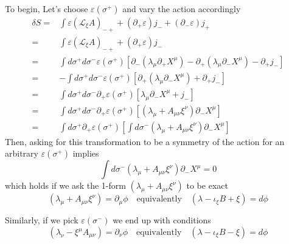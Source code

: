 \documentclass[a4paper,12pt]{article}
\numberwithin{equation}{section}
\numberwithin{thm}{section}
\numberwithin{exm}{section}
\newcommand{\p}{\partial}
\newcommand{\lag}{\mathcal L}
\newcommand{\<}{{\langle}}
\renewcommand{\>}{{\rangle}}
\newcommand{\ve}{{\varepsilon}}
\renewcommand{\l}{{\lambda}}
\newcommand{\m}{{\mu}}
\newcommand{\n}{{\nu}}
\newcommand{\s}{{\sigma}}
\begin{document}
To begin, Let's choose $\ve(\s^+)$ and vary the action accordingly
	\begin{align}
	\delta S=&\int \varepsilon (\lag_\xi A)_{-+}+(\p_+\varepsilon)j_- +(\p_-\varepsilon)j_+ \nonumber \\
	=&\int \varepsilon (\lag_\xi A)_{-+}+(\p_+\varepsilon)j_- \nonumber \\
	=&\int d\s^+d\s^- \ve(\s^+)\left[\p_-(\lambda_\mu\p_+X^\mu)-\p_+(\lambda_\mu\p_-X^\mu)-\p_+j_-\right] \nonumber \\
	=&-\int d\s^+d\s^- \ve(\s^+)\left[\p_+(\lambda_\mu\p_-X^\mu)+\p_+j_-\right] \nonumber \\
	=&\int d\s^+d\s^- \p_+\ve(\s^+)\left[\lambda_\mu\p_-X^\mu+j_-\right] \nonumber \\
	=&\int d\s^+d\s^- \p_+\ve(\s^+)\left[(\lambda_\mu+A_{\mu\nu}\xi^\nu)\p_-X^\mu\right] \nonumber \\
	=&\int d\s^+\p_+\ve(\s^+)\left[\int d\s^-(\lambda_\mu+A_{\mu\nu}\xi^\nu)\p_-X^\mu\right]
	\end{align}
Then, asking for this transformation to be a symmetry of the action for an arbitrary $\ve(\s^+)$ implies
	\begin{equation}
	\int d\s^-(\lambda_\mu+A_{\mu\nu}\xi^\nu)\p_-X^\mu=0
	\end{equation}
which holds if we ask the 1-form $(\lambda_\mu+A_{\mu\nu}\xi^\nu)$ to be exact
	\begin{equation}
	(\l_\m + A_{\m\n}\xi^\n) = \p_\m \phi \quad\text{equivalently}\quad (\l - \iota_\xi B + \xi)=d\phi
	\end{equation}

Similarly, if we pick $\ve(\s^-)$ we end up with conditions
	\begin{equation}
	(\lambda_\nu-\xi^\mu A_{\mu\nu})=\p_\nu \phi\quad\text{equivalently}\quad (\lambda-\iota_\xi B - \xi)=d\phi
	\end{equation}
\end{document}
